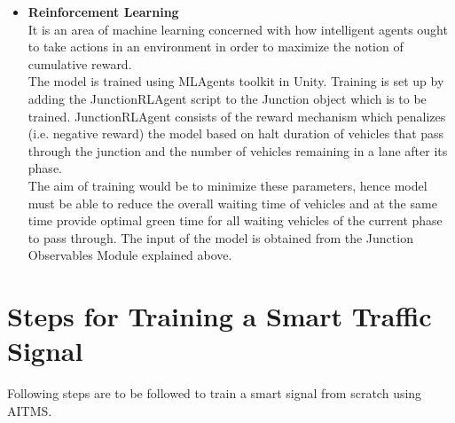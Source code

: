 \documentclass[openany,12pt]{report}
\begin{document}
\begin{itemize}
			
			
			\item{\textbf{Reinforcement Learning}}\\
			\hspace*{0.5in}It is an area of machine learning concerned with how intelligent agents ought to take actions in an environment in order to maximize the notion of cumulative reward.\\
			\hspace*{0.5in}The model is trained using MLAgents toolkit in Unity. Training is set up by adding the JunctionRLAgent script to the Junction object which is to be trained. JunctionRLAgent consists of the reward mechanism which penalizes (i.e. negative reward) the model based on halt duration of vehicles that pass through the junction and the number of vehicles remaining in a lane after its phase. \\
			\hspace*{0.5in}The aim of training would be to minimize these parameters, hence model must be able to reduce the overall waiting time of vehicles and at the same time provide optimal green time for all waiting vehicles of the current phase to pass through. The input of the model is obtained from the Junction Observables Module explained above.
			
		\end{itemize}
	
		\newpage
		\section{Steps for Training a Smart Traffic Signal}
		\hspace*{0.5 in}Following steps are to be followed to train a smart signal from scratch using AITMS.
\end{document}

